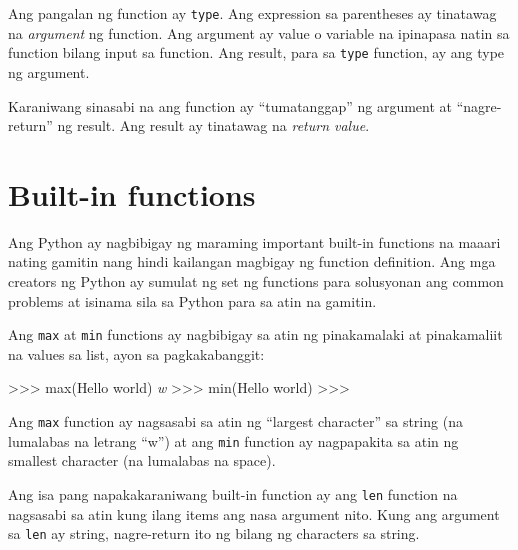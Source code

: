 \documentclass[10pt,]{book}
\newenvironment{Shaded}{}{}
\newcommand{\BuiltInTok}[1]{\textcolor[rgb]{0.00,0.50,0.00}{#1}}
\newcommand{\CommentTok}[1]{\textcolor[rgb]{0.38,0.63,0.69}{\textit{#1}}}
\newcommand{\NormalTok}[1]{#1}
\newcommand{\OperatorTok}[1]{\textcolor[rgb]{0.40,0.40,0.40}{#1}}
\newcommand{\StringTok}[1]{\textcolor[rgb]{0.25,0.44,0.63}{#1}}
\begin{document}
Ang pangalan ng function ay \texttt{type}. Ang expression sa parentheses
ay tinatawag na \emph{argument} ng function. Ang argument ay value o
variable na ipinapasa natin sa function bilang input sa function. Ang
result, para sa \texttt{type} function, ay ang type ng argument.


Karaniwang sinasabi na ang function ay ``tumatanggap'' ng argument at
``nagre-return'' ng result. Ang result ay tinatawag na \emph{return
value}.

 

\section{Built-in functions}\label{built-in-functions}

Ang Python ay nagbibigay ng maraming important built-in functions na
maaari nating gamitin nang hindi kailangan magbigay ng function
definition. Ang mga creators ng Python ay sumulat ng set ng functions
para solusyonan ang common problems at isinama sila sa Python para sa
atin na gamitin.

Ang \texttt{max} at \texttt{min} functions ay nagbibigay sa atin ng
pinakamalaki at pinakamaliit na values sa list, ayon sa pagkakabanggit:

\begin{Shaded}
\begin{Highlighting}[]
\OperatorTok{\textgreater{}\textgreater{}\textgreater{}} \BuiltInTok{max}\NormalTok{(}\StringTok{\textquotesingle{}Hello world\textquotesingle{}}\NormalTok{)}
\CommentTok{\textquotesingle{}w\textquotesingle{}}
\OperatorTok{\textgreater{}\textgreater{}\textgreater{}} \BuiltInTok{min}\NormalTok{(}\StringTok{\textquotesingle{}Hello world\textquotesingle{}}\NormalTok{)}
\CommentTok{\textquotesingle{} \textquotesingle{}}
\OperatorTok{\textgreater{}\textgreater{}\textgreater{}}
\end{Highlighting}
\end{Shaded}

Ang \texttt{max} function ay nagsasabi sa atin ng ``largest character''
sa string (na lumalabas na letrang ``w'') at ang \texttt{min} function
ay nagpapakita sa atin ng smallest character (na lumalabas na space).

Ang isa pang napakakaraniwang built-in function ay ang \texttt{len}
function na nagsasabi sa atin kung ilang items ang nasa argument nito.
Kung ang argument sa \texttt{len} ay string, nagre-return ito ng bilang
ng characters sa string.
\end{document}
